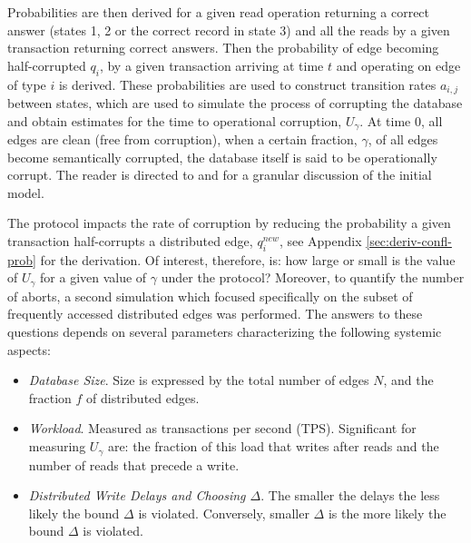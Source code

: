 Probabilities are then derived for a given read operation returning a correct answer (states 1, 2 or the correct record in state 3) and all the reads by a given transaction returning correct answers. Then the probability of edge becoming half-corrupted $q_i$, by a given transaction arriving at time $t$ and operating on edge of type $i$ is derived. These probabilities are used to construct transition rates $a_{i,j}$ between states, which are used to simulate the process of corrupting the database and obtain estimates for the time to operational corruption, $U_{\gamma}$. At time $0$, all edges are clean (free from corruption), when a certain fraction, $\gamma$, of all edges become semantically corrupted, the database itself is said to be operationally corrupt. The reader is directed to \cite{Ezhilchelvan2018} and \cite{Webber2019} for a granular discussion of the initial model.


The \tDelta protocol impacts the rate of corruption by reducing the probability a given transaction half-corrupts a distributed edge, $q^{new}_i$, see Appendix \ref{sec:deriv-confl-prob} for the derivation. Of interest, therefore, is: how large or small is the value of $U_\gamma$ for a given value of $\gamma$ under the \tDelta protocol? Moreover, to quantify the number of aborts, a second simulation which focused specifically on the subset of frequently accessed distributed edges was performed. The answers to these questions depends on several parameters characterizing the following systemic aspects:
\begin{itemize}
\item \emph{Database Size}. Size is expressed by the total number of edges $N$, and the fraction $f$ of distributed edges.
\item \emph{Workload}. Measured as transactions per second (TPS). Significant for measuring $U_{\gamma}$ are: the fraction of this load that writes after reads and the number of reads that precede a write.
\item \emph{Distributed Write Delays and Choosing $\Delta$}. The smaller the delays the less likely the bound $\Delta$ is violated. Conversely, smaller $\Delta$ is the more likely the bound $\Delta$ is violated.
\end{itemize}
